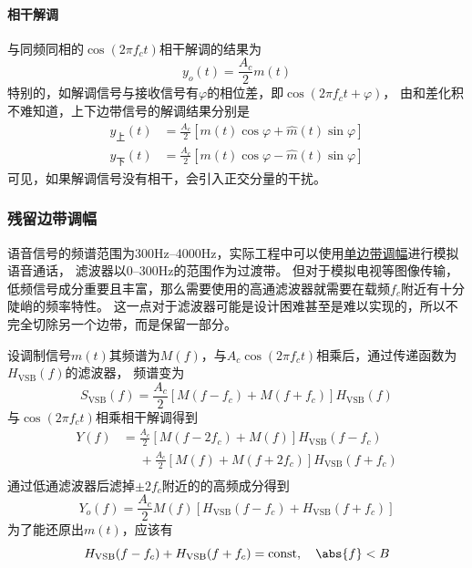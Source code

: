     \paragraph{相干解调}\mbox{}

    与同频同相的$\cos(2\pi f_ct)$相干解调的结果为
    \begin{equation}
        y_o(t)=\frac{A_c}{2}m(t)
    \end{equation}
    特别的，如解调信号与接收信号有$\varphi$的相位差，即$\cos(2\pi f_ct+\varphi)$，
    由和差化积不难知道，上下边带信号的解调结果分别是
    \begin{align}
        y_{\text{上}}(t)&=\frac{A_c}{2}[m(t)\cos\varphi+\hat{m}(t)\sin\varphi]\\
        y_{\text{下}}(t)&=\frac{A_c}{2}[m(t)\cos\varphi-\hat{m}(t)\sin\varphi]
    \end{align}
    可见，如果解调信号没有相干，会引入正交分量的干扰。

    \subsubsection{残留边带调幅}\label{subsubsec:VSB}

    语音信号的频谱范围为300Hz--4000Hz，实际工程中可以使用\hyperref[subsubsec:SSB]{单边带调幅}进行模拟语音通话，
    滤波器以0--300Hz的范围作为过渡带。
    但对于模拟电视等图像传输，低频信号成分重要且丰富，那么需要使用的高通滤波器就需要在载频$f_c$附近有十分陡峭的频率特性。
    这一点对于滤波器可能是设计困难甚至是难以实现的，所以不完全切除另一个边带，而是保留一部分。

    设调制信号$m(t)$其频谱为$M(f)$，与$A_c\cos(2\pi f_ct)$相乘后，通过传递函数为$H_{\text{VSB}}(f)$的滤波器，
    频谱变为
    \begin{equation}
        S_{\text{VSB}}(f)=\frac{A_c}{2}[M(f-f_c)+M(f+f_c)]H_{\text{VSB}}(f)
    \end{equation}
    与$\cos(2\pi f_ct)$相乘相干解调得到
    \begin{equation}
        \begin{split}
            Y(f)&=\frac{A_c}{2}[M(f-2f_c)+M(f)]H_{\text{VSB}}(f-f_c)\\
                &\phantom{=}+\frac{A_c}{2}[M(f)+M(f+2f_c)]H_{\text{VSB}}(f+f_c)\\
        \end{split}
    \end{equation}
    通过低通滤波器后滤掉$\pm 2f_c$附近的的高频成分得到
    \begin{equation}
        Y_o(f)=\frac{A_c}{2}M(f)[H_{\text{VSB}}(f-f_c)+H_{\text{VSB}}(f+f_c)]
    \end{equation}
    为了能还原出$m(t)$，应该有
    \begin{equation}
        H_{\text{VSB}}(f-f_c)+H_{\text{VSB}}(f+f_c)=\text{const},\hspace{1em}\abs{f}<B  
    \end{equation}

